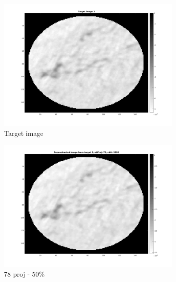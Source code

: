 \documentclass[10pt,a4paper,titlepage]{article}
\begin{document}
\begin{figure}[H]
        	
        	\begin{subfigure}[b]{0.32\textwidth}   
        	    \centering 
            	\includegraphics[width=\textwidth]{Sample3/target3.png}
            	\caption{Target image}  
        	\end{subfigure}
        	\begin{subfigure}[b]{0.32\textwidth}   
        	    \centering 
        	    \includegraphics[width=\textwidth]{Sample3/L-D_5000/78_1_2.png}
        	    \caption{78 proj - 50\%}  
        	    \label{subfig:78p3L-D}
       		\end{subfigure}
        	\begin{subfigure}[b]{0.32\textwidth}  
            	\centering 

\end{subfigure}
\end{figure}
\end{document}
